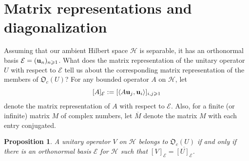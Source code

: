 \documentclass{dis}
\theoremstyle{plain}
\newtheorem{Proposition}[equation]{Proposition}
\theoremstyle{definition}
\renewcommand{\geq}{\geqslant}
\renewcommand{\vec}[1]{{\bf #1}}
\newcommand{\0}{{\color{lightgray}0}}
\begin{document}
\section{Matrix representations and diagonalization}






Assuming that our ambient Hilbert space $\mathcal{H}$ is separable, it has an orthonormal basis $\mathcal{E} = (\vec{u}_{n})_{n \geq 1}$. What does the matrix representation of the unitary operator $U$ with respect to $\mathcal{E}$ tell us about the corresponding matrix representation of the members of $\mathfrak{O}_c(U)$? For any bounded operator $A$ on $\mathcal{H}$, let
$$[A]_{\mathcal{E}} := [\langle A \vec{u}_j, \vec{u}_i\rangle]_{i, j \geq 1}$$ denote the matrix representation of $A$ with respect to $\mathcal{E}$. Also, for a finite (or  infinite) matrix $M $ of complex numbers, let $\overline{M}$ denote the matrix $M$ with each entry conjugated.

\begin{Proposition}\label{ksdlkfjsldf88}
A unitary operator $V$ on $\mathcal{H}$ belongs to $\mathfrak{O}_c(U)$ if and only if  there is an orthonormal basis $\mathcal{E}$ for $\mathcal{H}$ such that $ [V]_{\mathcal{E}} = \overline{[U]_{\mathcal{E}}}$.
\end{Proposition}
\end{document}
